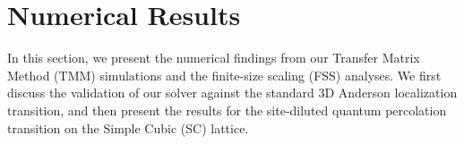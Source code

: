 \section{Numerical Results}
\label{sec:results}

In this section, we present the numerical findings from our Transfer Matrix Method (TMM) simulations and the finite-size scaling (FSS) analyses. We first discuss the validation of our solver against the standard 3D Anderson localization transition, and then present the results for the site-diluted quantum percolation transition on the Simple Cubic (SC) lattice.


